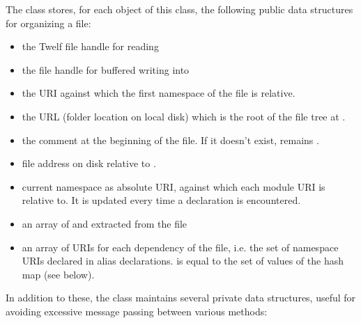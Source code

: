 The  class stores, for each object of this class, the following public data structures for organizing a file:
\begin{itemize}
\item {} the Twelf file handle for reading

\item {} the file handle for buffered writing into 

\item {} the URI against which the first namespace of the file is relative.

\item {} the URL (folder location on local disk) which is the root of the file tree at .

\item {} the  comment at the beginning of the file. If it doesn't exist,  remains .

\item {} file address on disk relative to .

\item {} current namespace as absolute URI, against which each module URI is relative to. It is updated every time a  declaration is encountered.

\item {} an array of  and  extracted from the file

\item {} an array of URIs for each dependency of the file, i.e. the set of namespace URIs declared in alias declarations.  is equal to the set of values of the hash map  (see below).

\end{itemize}

In addition to these, the class maintains several private data structures, useful for avoiding excessive message passing between various methods:

